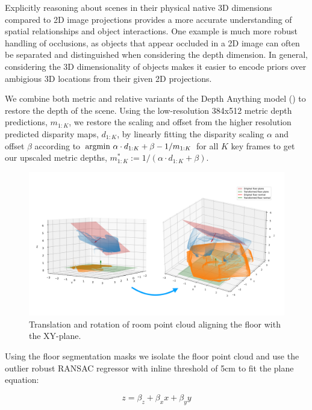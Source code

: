 Explicitly reasoning about scenes in their physical native 3D dimensions compared to 2D image projections provides a more accurate understanding of spatial relationships and object interactions. One example is much more robust handling of occlusions, as objects that appear occluded in a 2D image can often be separated and distinguished when considering the depth dimension. In general, considering the 3D dimensionality of objects makes it easier to encode priors over ambigious 3D locations from their given 2D projections.


We combine both metric and relative variants of the Depth Anything model (\cite{depthanything}) to restore the depth of the scene. Using the low-resolution 384x512 metric depth predictions, $m_{1:K}$, we restore the scaling and offset from the higher resolution predicted disparity maps, $d_{1:K}$, by linearly fitting the disparity scaling $\alpha$ and offset $\beta$ according to $\operatorname*{argmin\,} \alpha \cdot d_{1:K} + \beta - 1 / m_{1:K}$ for all $K$ key frames to get our upscaled metric depths, $m^*_{1:K} := 1 / (\alpha \cdot d_{1:K} + \beta)$.


\label{section:floor-plane}
\begin{figure}[H]
    \centering
    \includegraphics[width=\linewidth]{figures/rotation.pdf}
    \caption{Translation and rotation of room point cloud aligning the floor with the XY-plane.}
    \label{fig:rotate-floor-planes}
\end{figure}
Using the floor segmentation masks we isolate the floor point cloud and use the outlier robust RANSAC regressor with inline threshold of 5cm to fit the plane equation:

\begin{equation}
    z = \beta_z + \beta_x x + \beta_y y
\end{equation}


